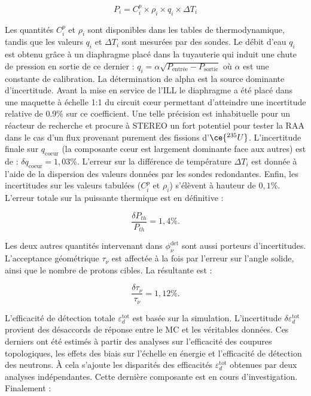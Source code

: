 \begin{equation}
    P_i = C_i^p \times \rho_i \times q_i \times \Delta T_i
\end{equation}

\bigbreak

Les quantités $C_i^p$ et $\rho_i$ sont disponibles dans les tables de thermodynamique, tandis que les valeurs $q_i$ et $\Delta T_i$ sont mesurées par des sondes. Le débit d'eau $q_i$ est obtenu grâce à un diaphragme placé dans la tuyauterie qui induit une chute de pression en sortie de ce dernier : $q_i = \alpha \sqrt{P_\textrm{entrée} - P_\textrm{sortie}}$ où $\alpha$ est une constante de calibration. La détermination de alpha est la source dominante d'incertitude. Avant la mise en service de l'ILL le diaphragme a été placé dans une maquette à échelle 1:1 du circuit \og c\oe ur \fg{} permettant d'atteindre une incertitude relative de 0.9\% sur ce coefficient. Une telle précision est inhabituelle pour un réacteur de recherche et procure à STEREO un fort potentiel pour tester la RAA dans le cas d'un flux provenant purement des fissions d'$\ce{^{235}U}$. L'incertitude finale sur $q_\textrm{coeur}$ (la composante \og c\oe ur \fg{} est largement dominante face aux autres) est de : $\delta q_\textrm{coeur} = 1,03 \%$. L'erreur sur la différence de température $\Delta T_i$ est donnée à l'aide de la dispersion des valeurs données par les sondes redondantes. Enfin, les incertitudes sur les valeurs tabulées ($C_i^p$ et $\rho_i$) s'élèvent à hauteur de $0,1 \%$. L'erreur totale sur la puissante thermique est en définitive :

\begin{equation}
    \frac{\delta P_{th}}{P_{th}} = 1,4 \% .
\end{equation}

\bigbreak

Les deux autres quantités intervenant dans $\phi^\textrm{det}_\nu$ sont aussi porteurs d'incertitudes. L'acceptance géométrique $\tau_\nu$ est affectée à la fois par l'erreur sur l'angle solide, ainsi que le nombre de protons cibles. La résultante est :

\begin{equation}
    \frac{\delta \tau_\nu}{\tau_\nu} = 1,12 \% .
\end{equation}

\bigbreak

L'efficacité de détection totale $\varepsilon^\textrm{tot}_d$ est basée sur la simulation. L'incertitude $\delta \varepsilon^\textrm{tot}_d$ provient des désaccords de réponse entre le MC et les véritables données. Ces derniers ont été estimés à partir des analyses sur l'efficacité des coupures topologiques, les effets des biais sur l'échelle en énergie et l'efficacité de détection des neutrons. À cela s'ajoute les disparités des efficacités $\varepsilon^\textrm{tot}_d$ obtenues par deux analyses indépendantes. Cette dernière composante est en cours d'investigation. Finalement :

